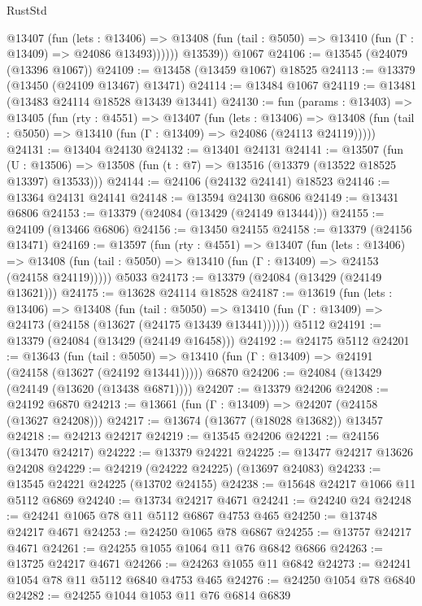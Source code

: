 \begin{lexlean}{RustStd}
\begin{coremodule}
            @13407
              (fun (lets : @13406) =>
              @13408 (fun (tail : @5050) => @13410 (fun (Γ : @13409) => @24086 @13493))))))
        @13539))
    @1067
@24106 := @13545 (@24079 (@13396 @1067))
@24109 := @13458 (@13459 @1067) @18525
@24113 := @13379 (@13450 (@24109 @13467) @13471)
@24114 := @13484 @1067
@24119 := @13481 (@13483 @24114 @18528 @13439 @13441)
@24130 := fun (params : @13403) =>
  @13405
    (fun (rty : @4551) =>
    @13407
      (fun (lets : @13406) =>
      @13408 (fun (tail : @5050) => @13410 (fun (Γ : @13409) => @24086 (@24113 @24119)))))
@24131 := @13404 @24130
@24132 := @13401 @24131
@24141 := @13507
    (fun (U : @13506) => @13508 (fun (t : @7) => @13516 (@13379 (@13522 @18525 @13397) @13533)))
@24144 := @24106 (@24132 @24141) @18523
@24146 := @13364 @24131 @24141
@24148 := @13594 @24130 @6806
@24149 := @13431 @6806
@24153 := @13379 (@24084 (@13429 (@24149 @13444)))
@24155 := @24109 (@13466 @6806)
@24156 := @13450 @24155
@24158 := @13379 (@24156 @13471)
@24169 := @13597
    (fun (rty : @4551) =>
    @13407
      (fun (lets : @13406) =>
      @13408 (fun (tail : @5050) => @13410 (fun (Γ : @13409) => @24153 (@24158 @24119)))))
    @5033
@24173 := @13379 (@24084 (@13429 (@24149 @13621)))
@24175 := @13628 @24114 @18528
@24187 := @13619
    (fun (lets : @13406) =>
    @13408
      (fun (tail : @5050) =>
      @13410 (fun (Γ : @13409) => @24173 (@24158 (@13627 (@24175 @13439 @13441))))))
    @5112
@24191 := @13379 (@24084 (@13429 (@24149 @16458)))
@24192 := @24175 @5112
@24201 := @13643
    (fun (tail : @5050) => @13410 (fun (Γ : @13409) => @24191 (@24158 (@13627 (@24192 @13441)))))
    @6870
@24206 := @24084 (@13429 (@24149 (@13620 (@13438 @6871))))
@24207 := @13379 @24206
@24208 := @24192 @6870
@24213 := @13661 (fun (Γ : @13409) => @24207 (@24158 (@13627 @24208)))
@24217 := @13674 (@13677 (@18028 @13682)) @13457
@24218 := @24213 @24217
@24219 := @13545 @24206
@24221 := @24156 (@13470 @24217)
@24222 := @13379 @24221
@24225 := @13477 @24217 @13626 @24208
@24229 := @24219 (@24222 @24225) (@13697 @24083)
@24233 := @13545 @24221 @24225 (@13702 @24155)
@24238 := @15648 @24217 @1066 @11 @5112 @6869
@24240 := @13734 @24217 @4671
@24241 := @24240 @24
@24248 := @24241 @1065 @78 @11 @5112 @6867 @4753 @465
@24250 := @13748 @24217 @4671
@24253 := @24250 @1065 @78 @6867
@24255 := @13757 @24217 @4671
@24261 := @24255 @1055 @1064 @11 @76 @6842 @6866
@24263 := @13725 @24217 @4671
@24266 := @24263 @1055 @11 @6842
@24273 := @24241 @1054 @78 @11 @5112 @6840 @4753 @465
@24276 := @24250 @1054 @78 @6840
@24282 := @24255 @1044 @1053 @11 @76 @6814 @6839

\end{coremodule}
\end{lexlean}
